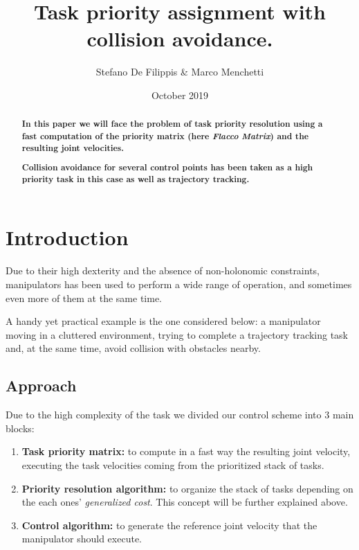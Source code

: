 \documentclass[12pt,a4paper, twocolumn, twoside]{article}
\begin{document}
	
	\title{Task priority assignment with collision avoidance.}
	\author{Stefano De Filippis \& Marco Menchetti}
	\date{October 2019}
	\maketitle
	
\begin{abstract}
	\textbf{
	In this paper we will face the problem of task priority resolution using a fast computation of the priority matrix (here \textit{Flacco Matrix}) and the resulting joint velocities.}

\textbf{
	Collision avoidance for several control points has been taken as a high priority task in this case as well as trajectory tracking.}
\end{abstract}
\section*{Introduction}
Due to their high dexterity and the absence of non-holonomic constraints, manipulators has been used to perform a wide range of operation, and sometimes even more of them at the same time.

A handy yet practical example is the one considered below: a manipulator moving in a cluttered environment, trying to complete a trajectory tracking task and, at the same time, avoid collision with obstacles nearby.

\subsection*{Approach}
Due to the high complexity of the task we divided our control scheme into 3 main blocks:
\begin{enumerate}
	\item \textbf{Task priority matrix:} to compute in a fast way the resulting joint velocity, executing the task velocities coming from the prioritized stack of tasks.
	\item \textbf{Priority resolution algorithm:} to organize the stack of tasks depending on the each ones' \textit{generalized cost}.
	This concept will be further explained above.
	\item \textbf{Control algorithm:} to generate the reference joint velocity that the manipulator should execute.
\end{enumerate}
\end{document}
